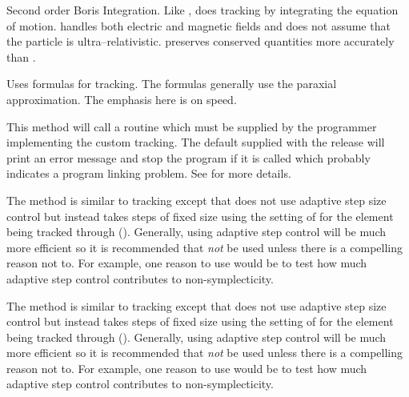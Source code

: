 \begin{description}

\item[\vn{Boris}]
Second order Boris Integration\cite{b:boris}. Like ,
 does tracking by integrating the equation of
motion.  handles both electric and magnetic fields and does
not assume that the particle is ultra--relativistic.  preserves
conserved quantities more accurately than .

\item[\vn{Bmad_Standard}]
Uses formulas for tracking. The formulas generally use the paraxial
approximation.  The emphasis here is on speed.

\item[\vn{Custom}]
This method will call a routine  which must be
supplied by the programmer implementing the custom tracking. The
default  supplied with the \bmad release will print
an error message and stop the program if it is called which probably
indicates a program linking problem. See  for more details.

\item[\vn{fixed_step_runge_kutta}]
The  method is similar to  tracking except that
 does not use adaptive step size control but instead takes steps of fixed
size using the setting of  for the element being tracked through ().
Generally, using adaptive step control will be much more efficient so it is recommended that
 {\em not} be used unless there is a compelling reason not to. For
example, one reason to use  would be to test how much adaptive step
control contributes to non-symplecticity.

\item[\vn{fixed_step_time_runge_kutta}]
The  method is similar to  tracking except that
 does not use adaptive step size control but instead takes steps of fixed
size using the setting of  for the element being tracked through ().
Generally, using adaptive step control will be much more efficient so it is recommended that
 {\em not} be used unless there is a compelling reason not to. For
example, one reason to use  would be to test how much adaptive step
control contributes to non-symplecticity.


\end{description}
